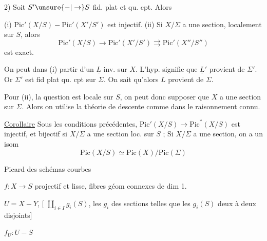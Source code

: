2) Soit $S'\unsure{-|\to}S$ fid. plat et qu. cpt. Alors

(i) $\mathrm{Pic}'(X/S)-\mathrm{Pic}'(X'/S')$ est injectif. (ii) Si $X/\Sigma$ a  une section,  localement sur $S$, alors
\[
\mathrm{Pic}'(X/S)\to\mathrm{Pic}'(X'/S')\rightrightarrows\mathrm{Pic}'(X''/S'')
\]
est exact.

On peut dans (i) partir d'un $\underline L$ inv. sur $X$.  L'hyp. signifie que $\underline L'$ provient de $\Sigma'$. Or $\Sigma'$ est fid plat qu. cpt sur $\Sigma$. On sait qu'alors  $L$ provient de $\Sigma$.

Pour (ii),  la question est locale sur $S$, on peut donc supposer que $X$ a une section sur $\Sigma$. Alors on utilise la théorie de descente comme dans le raisonnement connu.

\uline{Corollaire}  Sous les conditions précédentes, $\mathrm{Pic}'(X/S)\to\mathrm{Pic}^{*}(X/S)$ est injectif, et  bijectif si $X/\Sigma$  a une section loc. sur $S$ ; Si $X/\Sigma$ a  une section, on a un isom
\[
\mathrm{Pic}(X/S)\simeq\mathrm{Pic}(X)/\mathrm{Pic}(\Sigma)
\]

Picard des schémas  courbes

$f:X\to S$ projectif et lisse, fibres géom connexes de dim 1.

$U=X-Y$,   [ $\coprod_{i\in I}g_i(S)$, les $g_i$ des sections telles que les $g_i(S)$ deux à deux disjoints]

$f_U:U-S$

